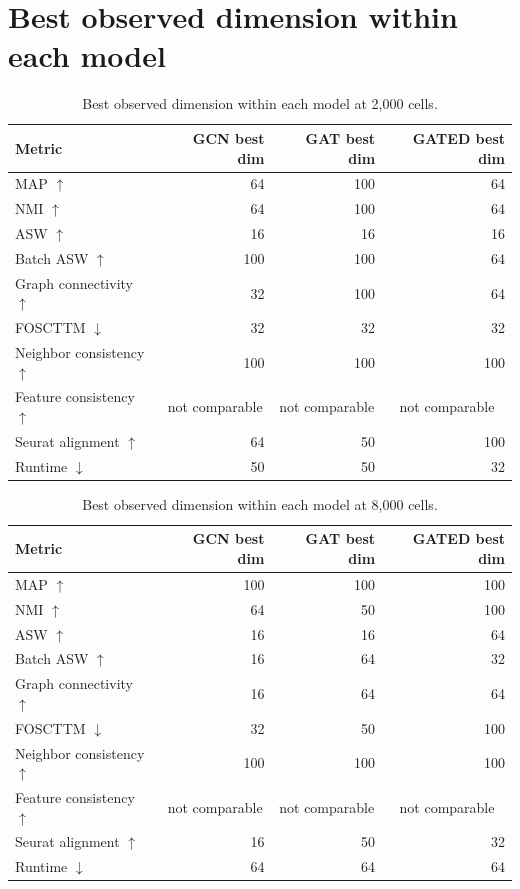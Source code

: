 \documentclass[10pt]{article}
\begin{document}
\section{Best observed dimension within each model}
\begin{table}[H]\centering\small
\caption{Best observed dimension within each model at 2,000 cells.}
\begin{tabular}{@{}lrrr@{}}\toprule
Metric & GCN best dim & GAT best dim & GATED best dim \\\midrule
MAP $\uparrow$ & 64 & 100 & 64 \\
NMI $\uparrow$ & 64 & 100 & 64 \\
ASW $\uparrow$ & 16 & 16 & 16 \\
Batch ASW $\uparrow$ & 100 & 100 & 64 \\
Graph connectivity $\uparrow$ & 32 & 100 & 64 \\
FOSCTTM $\downarrow$ & 32 & 32 & 32 \\
Neighbor consistency $\uparrow$ & 100 & 100 & 100 \\
Feature consistency $\uparrow$ & \multicolumn{1}{c}{not comparable} & \multicolumn{1}{c}{not comparable} & \multicolumn{1}{c}{not comparable} \\
Seurat alignment $\uparrow$ & 64 & 50 & 100 \\
Runtime $\downarrow$ & 50 & 50 & 32 \\
\bottomrule\end{tabular}\end{table}
\begin{table}[H]\centering\small
\caption{Best observed dimension within each model at 8,000 cells.}
\begin{tabular}{@{}lrrr@{}}\toprule
Metric & GCN best dim & GAT best dim & GATED best dim \\\midrule
MAP $\uparrow$ & 100 & 100 & 100 \\
NMI $\uparrow$ & 64 & 50 & 100 \\
ASW $\uparrow$ & 16 & 16 & 64 \\
Batch ASW $\uparrow$ & 16 & 64 & 32 \\
Graph connectivity $\uparrow$ & 16 & 64 & 64 \\
FOSCTTM $\downarrow$ & 32 & 50 & 100 \\
Neighbor consistency $\uparrow$ & 100 & 100 & 100 \\
Feature consistency $\uparrow$ & \multicolumn{1}{c}{not comparable} & \multicolumn{1}{c}{not comparable} & \multicolumn{1}{c}{not comparable} \\
Seurat alignment $\uparrow$ & 16 & 50 & 32 \\
Runtime $\downarrow$ & 64 & 64 & 64 \\
\bottomrule\end{tabular}\end{table}
\end{document}
